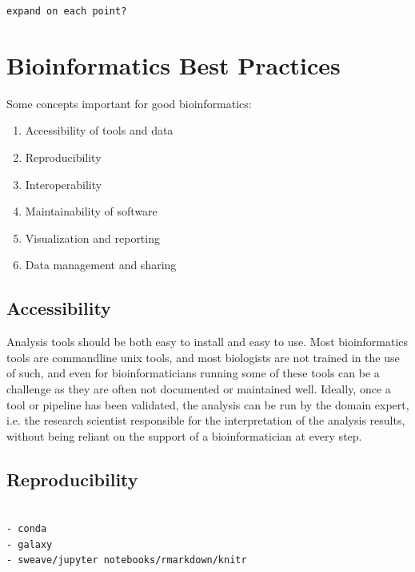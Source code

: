 \verb+expand on each point?+

\section{Bioinformatics Best Practices}

Some concepts important for good bioinformatics:

\begin{enumerate}
    \itemsep-0.5em
    \item Accessibility of tools and data %
    \item Reproducibility %
    \item Interoperability %
    \item Maintainability of software %
    \item Visualization and reporting
    \item Data management and sharing %
\end{enumerate}


\subsection{Accessibility}
Analysis tools should be both easy to install and easy to use. Most bioinformatics tools are commandline unix tools, and most biologists are not trained in the use of such, and even for bioinformaticians running some of these tools can be a challenge as they are often not documented or maintained well. Ideally, once a tool or pipeline has been validated, the analysis can be run by the domain expert, i.e. the research scientist responsible for the interpretation of the analysis results, without being reliant on the support of a bioinformatician at every step.

\subsection{Reproducibility}
\begin{verbatim}

- conda
- galaxy
- sweave/jupyter notebooks/rmarkdown/knitr

\end{verbatim}

